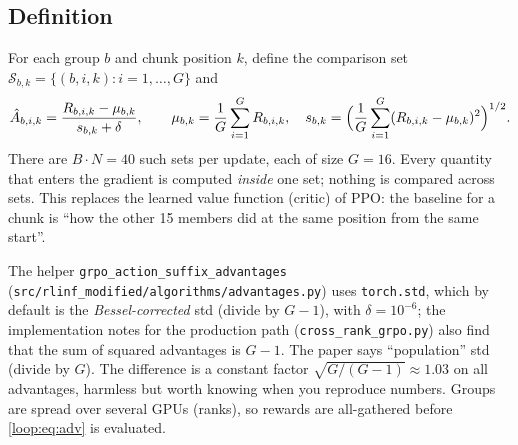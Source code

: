 \subsection{Definition}
For each group $b$ and chunk position $k$, define the comparison set $\mathcal S_{b,k}=\{(b,i,k):i=1,\dots,G\}$ and
\begin{equation}
\hat A_{b,i,k}=\frac{R_{b,i,k}-\mu_{b,k}}{s_{b,k}+\delta},\qquad
\mu_{b,k}=\frac1G\sum_{i=1}^{G}R_{b,i,k},\quad
s_{b,k}=\Big(\frac1G\sum_{i=1}^{G}(R_{b,i,k}-\mu_{b,k})^2\Big)^{1/2}.
\label{loop:eq:adv}
\end{equation}
There are $B\cdot N=40$ such sets per update, each of size $G=16$. Every quantity that enters the gradient is computed \emph{inside} one set; nothing is compared across sets. This replaces the learned value function (critic) of PPO: the baseline for a chunk is ``how the other 15 members did at the same position from the same start''.

\begin{codenote}[(advantages)]
The helper \texttt{grpo\_action\_suffix\_advantages} (\texttt{src/rlinf\_modified/algorithms/advantages.py}) uses \texttt{torch.std}, which by default is the \emph{Bessel-corrected} std (divide by $G-1$), with $\delta=10^{-6}$; the implementation notes for the production path (\texttt{cross\_rank\_grpo.py}) also find that the sum of squared advantages is $G-1$. The paper says ``population'' std (divide by $G$). The difference is a constant factor $\sqrt{G/(G-1)}\approx1.03$ on all advantages, harmless but worth knowing when you reproduce numbers. Groups are spread over several GPUs (ranks), so rewards are all-gathered before \eqref{loop:eq:adv} is evaluated.
\end{codenote}


